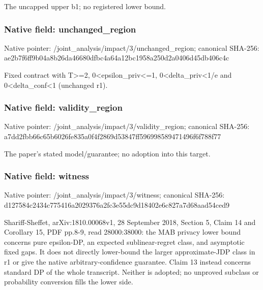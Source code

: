 \documentclass[10pt,a4paper]{article}
\begin{document}
\begingroup\raggedright\sloppy The uncapped upper b1;\allowbreak{} no registered lower bound.\par\endgroup

\subsubsection{Native field: unchanged\_\allowbreak{}region}
Native pointer: /joint\_\allowbreak{}analysis/impact/3/unchanged\_\allowbreak{}region; canonical SHA-256: ae2b7f6ff9b04a8b26da46680dfbc4a64a12bc1958a250d2a0406d45db406c4c

\begingroup\raggedright\sloppy Fixed contract with T>=\allowbreak{}2,\allowbreak{} 0<epsilon\_\allowbreak{}priv<=\allowbreak{}1,\allowbreak{} 0<delta\_\allowbreak{}priv<1/\allowbreak{}e and 0<delta\_\allowbreak{}conf<1 (unchanged r1).\par\endgroup

\subsubsection{Native field: validity\_\allowbreak{}region}
Native pointer: /joint\_\allowbreak{}analysis/impact/3/validity\_\allowbreak{}region; canonical SHA-256: a7dd2fbb66c65b6026fe835a0f4f2869d53847ff596998589471496f6f788f77

\begingroup\raggedright\sloppy The paper's stated model/\allowbreak{}guarantee;\allowbreak{} no adoption into this target.\par\endgroup

\subsubsection{Native field: witness}
Native pointer: /joint\_\allowbreak{}analysis/impact/3/witness; canonical SHA-256: d127584c2434c775416a2029376a2fc3e55dc9d18402e6c827a7d68aad54ced9

\begingroup\raggedright\sloppy Shariff-Sheffet,\allowbreak{} arXiv:\allowbreak{}1810.00068v1,\allowbreak{} 28 September 2018,\allowbreak{} Section 5,\allowbreak{} Claim 14 and Corollary 15,\allowbreak{} PDF pp.8-9,\allowbreak{} read 28000:\allowbreak{}38000:\allowbreak{} the MAB privacy lower bound concerns pure epsilon-DP,\allowbreak{} an expected sublinear-regret class,\allowbreak{} and asymptotic fixed gaps. It does not directly lower-bound the larger approximate-JDP class in r1 or give the native arbitrary-confidence guarantee. Claim 13 instead concerns standard DP of the whole transcript. Neither is adopted;\allowbreak{} no unproved subclass or probability conversion fills the lower side.\par\endgroup
\end{document}
